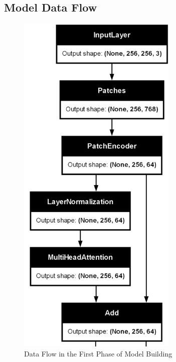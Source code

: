 \subsection{Model Data Flow}

\begin{figure}[htbp]
    \centering
    \includegraphics[width=3in]{img/1STPHASE.png}
    \caption{{Data Flow in the First Phase of Model Building}}
\end{figure}

